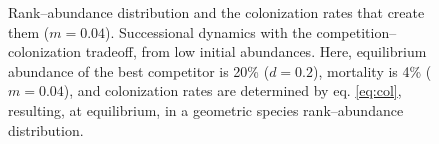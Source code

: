 \begin{figure}[ht]
  \centering
{}
  \caption[Equilibrium Properties]{ Rank--abundance distribution and the colonization rates that create them ($m=0.04$).  Successional dynamics with the competition--colonization tradeoff, from low initial abundances. Here, equilibrium abundance of the best competitor is 20\% ($d=0.2$), mortality is 4\% ($m=0.04$), and colonization rates are determined by eq. \ref{eq:col}, resulting, at equilibrium, in a geometric species rank--abundance distribution.}
\end{figure}


